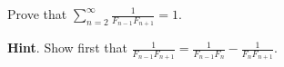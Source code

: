 \documentclass{book}
\begin{document}
\setcounter{cpjt}{161}
\addtocounter{cpjt}{-1}
\begin{activity}\label{activity-154}
\hypertarget{p-974}{}%
Prove that \(\sum_{n = 2}^{\infty}\frac{1}{F_{n - 1}F_{n + 1}} = 1\).%
\par\smallskip%
\noindent\textbf{Hint}.\hypertarget{hint-111}{}\quad%
\hypertarget{p-975}{}%
Show first that \(\frac{1}{F_{n - 1}F_{n + 1}} = \frac{1}{F_{n - 1}F_{n}} -
\frac{1}{F_{n}F_{n + 1}}\).%
\end{activity}

\clearpage
\end{document}
